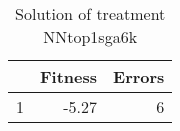 \begin{table}[ht]
\centering
\begin{tabular}{rrr}
  \hline
 & Fitness & Errors \\ 
  \hline
1 & -5.27 &   6 \\ 
   \hline
\end{tabular}
\caption{Solution of treatment NNtop1sga6k} 
\end{table}
